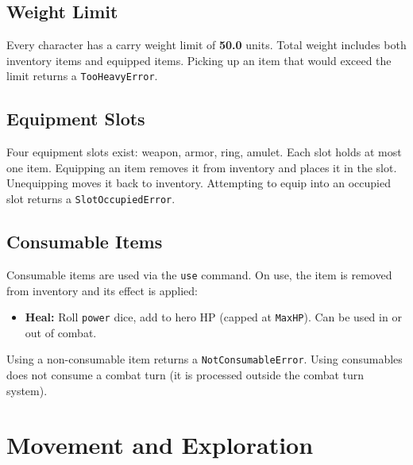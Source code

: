 \documentclass[a4paper,10pt]{article}
\newcommand{\cmd}[1]{\texttt{#1}}
\newcommand{\field}[1]{\texttt{#1}}
\begin{document}
\subsection{Weight Limit}

Every character has a carry weight limit of \textbf{50.0} units. Total
weight includes both inventory items and equipped items. Picking up an
item that would exceed the limit returns a \texttt{TooHeavyError}.

\subsection{Equipment Slots}

Four equipment slots exist: weapon, armor, ring, amulet. Each slot holds
at most one item. Equipping an item removes it from inventory and places
it in the slot. Unequipping moves it back to inventory. Attempting to equip
into an occupied slot returns a \texttt{SlotOccupiedError}.

\subsection{Consumable Items}

Consumable items are used via the \cmd{use} command. On use, the item is
removed from inventory and its effect is applied:

\begin{itemize}[nosep]
  \item \textbf{Heal:} Roll \field{power} dice, add to hero HP (capped
        at \field{MaxHP}). Can be used in or out of combat.
\end{itemize}

Using a non-consumable item returns a \texttt{NotConsumableError}.
Using consumables does not consume a combat turn (it is processed outside
the combat turn system).

\section{Movement and Exploration}
\end{document}
